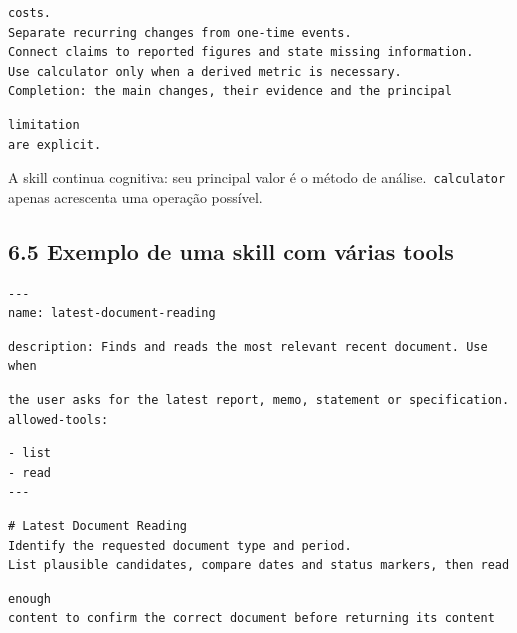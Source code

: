 \documentclass[12pt,a4paper]{article}
\begin{document}
\begin{Verbatim}[breaklines=true,breakanywhere=true,fontsize=\small]
costs.
Separate recurring changes from one-time events.
Connect claims to reported figures and state missing information.
Use calculator only when a derived metric is necessary.
Completion: the main changes, their evidence and the principal
\end{Verbatim}

\begin{Verbatim}[breaklines=true,breakanywhere=true,fontsize=\small]
limitation
are explicit.
\end{Verbatim}

A skill continua cognitiva: seu principal valor é o método de análise.\texttt{ calculator} apenas acrescenta uma operação possível.


\subsection*{6.5 Exemplo de uma skill com várias tools}

\begin{Verbatim}[breaklines=true,breakanywhere=true,fontsize=\small]
---
name: latest-document-reading
\end{Verbatim}


\begin{Verbatim}[breaklines=true,breakanywhere=true,fontsize=\small]
description: Finds and reads the most relevant recent document. Use when
\end{Verbatim}

\begin{Verbatim}[breaklines=true,breakanywhere=true,fontsize=\small]
the user asks for the latest report, memo, statement or specification.
allowed-tools:
\end{Verbatim}

\begin{Verbatim}[breaklines=true,breakanywhere=true,fontsize=\small]
- list
- read
---
\end{Verbatim}

\begin{Verbatim}[breaklines=true,breakanywhere=true,fontsize=\small]
# Latest Document Reading
Identify the requested document type and period.
List plausible candidates, compare dates and status markers, then read
\end{Verbatim}

\begin{Verbatim}[breaklines=true,breakanywhere=true,fontsize=\small]
enough
content to confirm the correct document before returning its content
\end{Verbatim}
\end{document}
